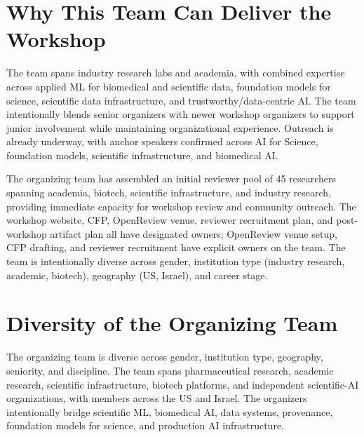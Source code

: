 \documentclass[10pt]{article}
\begin{document}



\section{Why This Team Can Deliver the Workshop}
\label{sec:org-fit}
The team spans industry research labs and academia, with combined expertise across applied ML for biomedical and scientific data, foundation models for science, scientific data infrastructure, and trustworthy/data-centric AI. The team intentionally blends senior organizers with newer workshop organizers to support junior involvement while maintaining organizational experience. Outreach is already underway, with anchor speakers confirmed across AI for Science, foundation models, scientific infrastructure, and biomedical AI. 

The organizing team has assembled an initial reviewer pool of 45 researchers spanning academia, biotech, scientific infrastructure, and industry research, providing immediate capacity for workshop review and community outreach. The workshop website, CFP, OpenReview venue, reviewer recruitment plan, and post-workshop artifact plan all have designated owners; OpenReview venue setup, CFP drafting, and reviewer recruitment have explicit owners on the team. The team is intentionally diverse across gender, institution type (industry research, academic, biotech), geography (US, Israel), and career stage.

\section{Diversity of the Organizing Team}
\label{sec:org-diversity}
The organizing team is diverse across gender, institution type, geography, seniority, and discipline. The team spans pharmaceutical research, academic research, scientific infrastructure, biotech platforms, and independent scientific-AI organizations, with members across the US and Israel. The organizers intentionally bridge scientific ML, biomedical AI, data systems, provenance, foundation models for science, and production AI infrastructure. 
\end{document}

